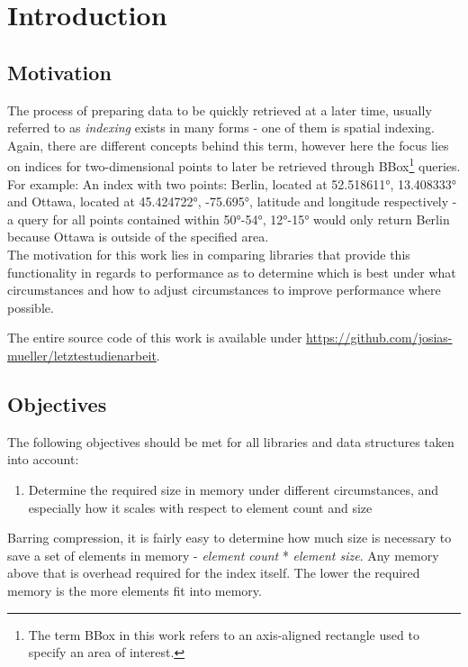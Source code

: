 
\chapter{Introduction}
\label{chap:intr}
\section{Motivation}

The process of preparing data to be quickly retrieved at a later time, usually referred to as \textit{indexing} exists in many forms - one of them is spatial indexing.\\
Again, there are different concepts behind this term, however here the focus lies on indices for two-dimensional points to later be retrieved through \acs{BBox}\footnote{The term \acl{BBox} in this work refers to an axis-aligned rectangle used to specify an area of interest.} queries.\\
For example: An index with two points: Berlin, located at 52.518611°, 13.408333° and Ottawa, located at 45.424722°, -75.695°, latitude and longitude respectively - a query for all points contained within 50°-54°, 12°-15° would only return Berlin because Ottawa is outside of the specified area.\\
The motivation for this work lies in comparing libraries that provide this functionality in regards to performance as to determine which is best under what circumstances and how to adjust circumstances to improve performance where possible.

The entire source code of this work is available under \url{https://github.com/josias-mueller/letztestudienarbeit}.

\section{Objectives}

The following objectives should be met for all libraries and data structures taken into account:
\begin{enumerate}
    \setcounter{enumi}{0}
    \item Determine the required size in memory under different circumstances, and especially how it scales with respect to element count and size
\end{enumerate}
\begin{addmargin}[25pt]{0pt}
    Barring compression, it is fairly easy to determine how much size is necessary to save a set of elements in memory - \textit{element count} * \textit{element size}. Any memory above that is overhead required for the index itself. The lower the required memory is the more elements fit into memory.
\end{addmargin}

